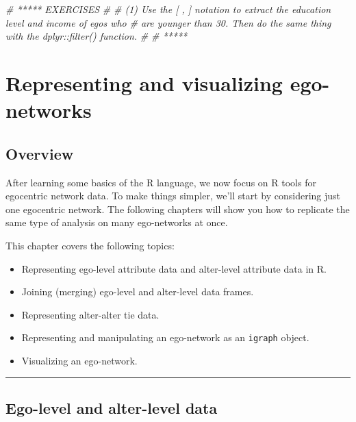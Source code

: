 \documentclass[
]{book}
\newenvironment{Shaded}{\begin{snugshade}}{\end{snugshade}}
\newcommand{\CommentTok}[1]{\textcolor[rgb]{0.56,0.35,0.01}{\textit{#1}}}
\providecommand{\tightlist}{%
  \setlength{\itemsep}{0pt}\setlength{\parskip}{0pt}}
\begin{document}
\begin{Shaded}
\begin{Highlighting}[]
\CommentTok{\# ***** EXERCISES }
\CommentTok{\#}
\CommentTok{\# (1) Use the [ , ] notation to extract the education level and income of egos who}
\CommentTok{\# are younger than 30. Then do the same thing with the dplyr::filter() function.}
\CommentTok{\# }
\CommentTok{\# *****}
\end{Highlighting}
\end{Shaded}

\hypertarget{represent}{%
\chapter{Representing and visualizing ego-networks}\label{represent}}

\hypertarget{overview-1}{%
\section{Overview}\label{overview-1}}

After learning some basics of the R language, we now focus on R tools for egocentric network data. To make things simpler, we'll start by considering just one egocentric network. The following chapters will show you how to replicate the same type of analysis on many ego-networks at once.

This chapter covers the following topics:

\begin{itemize}
\tightlist
\item
  Representing ego-level attribute data and alter-level attribute data in R.
\item
  Joining (merging) ego-level and alter-level data frames.
\item
  Representing alter-alter tie data.
\item
  Representing and manipulating an ego-network as an \texttt{igraph} object.
\item
  Visualizing an ego-network.
\end{itemize}

\begin{center}\rule{0.5\linewidth}{0.5pt}\end{center}

\hypertarget{egocentric-data}{%
\section{Ego-level and alter-level data}\label{egocentric-data}}
\end{document}
